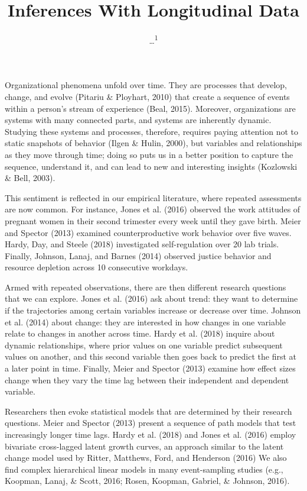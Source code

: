 \documentclass[english,,man]{apa6}
\title{Inferences With Longitudinal Data}
\author{\ldots{}\textsuperscript{1}}
\date{}
\affiliation{
\vspace{0.5cm}
\textsuperscript{1} ...}
\theoremstyle{definition}
\theoremstyle{definition}
\theoremstyle{definition}
\theoremstyle{remark}
\begin{document}
\maketitle

Organizational phenomena unfold over time. They are processes that
develop, change, and evolve (Pitariu \& Ployhart, 2010) that create a
sequence of events within a person's stream of experience (Beal, 2015).
Moreover, organizations are systems with many connected parts, and
systems are inherently dynamic. Studying these systems and processes,
therefore, requires paying attention not to static snapshots of behavior
(Ilgen \& Hulin, 2000), but variables and relationships as they move
through time; doing so puts us in a better position to capture the
sequence, understand it, and can lead to new and interesting insights
(Kozlowski \& Bell, 2003).

This sentiment is reflected in our empirical literature, where repeated
assessments are now common. For instance, Jones et al. (2016) observed
the work attitudes of pregnant women in their second trimester every
week until they gave birth. Meier and Spector (2013) examined
counterproductive work behavior over five waves. Hardy, Day, and Steele
(2018) investigated self-regulation over 20 lab trials. Finally,
Johnson, Lanaj, and Barnes (2014) observed justice behavior and resource
depletion across 10 consecutive workdays.

Armed with repeated observations, there are then different research
questions that we can explore. Jones et al. (2016) ask about trend: they
want to determine if the trajectories among certain variables increase
or decrease over time. Johnson et al. (2014) about change: they are
interested in how changes in one variable relate to changes in another
across time. Hardy et al. (2018) inquire about dynamic relationships,
where prior values on one variable predict subsequent values on another,
and this second variable then goes back to predict the first at a later
point in time. Finally, Meier and Spector (2013) examine how effect
sizes change when they vary the time lag between their independent and
dependent variable.

Researchers then evoke statistical models that are determined by their
research questions. Meier and Spector (2013) present a sequence of path
models that test increasingly longer time lags. Hardy et al. (2018) and
Jones et al. (2016) employ bivariate cross-lagged latent growth curves,
an approach similar to the latent change model used by Ritter, Matthews,
Ford, and Henderson (2016) We also find complex hierarchical linear
models in many event-sampling studies (e.g., Koopman, Lanaj, \& Scott,
2016; Rosen, Koopman, Gabriel, \& Johnson, 2016).
\end{document}
